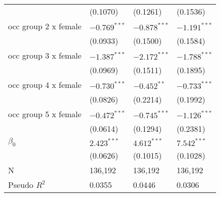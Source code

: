 \begin{tabular}{llll}
                                       &           (0.1070) &           (0.1261) &           (0.1536) \\
occ group 2 x female                   &     $-0.769^{***}$ &     $-0.878^{***}$ &     $-1.191^{***}$ \\
                                       &           (0.0933) &           (0.1500) &           (0.1584) \\
occ group 3 x female                   &     $-1.387^{***}$ &     $-2.172^{***}$ &     $-1.788^{***}$ \\
                                       &           (0.0969) &           (0.1511) &           (0.1895) \\
occ group 4 x female                   &     $-0.730^{***}$ &      $-0.452^{**}$ &     $-0.733^{***}$ \\
                                       &           (0.0826) &           (0.2214) &           (0.1992) \\
occ group 5 x female                   &     $-0.472^{***}$ &     $-0.745^{***}$ &     $-1.126^{***}$ \\
                                       &           (0.0614) &           (0.1294) &           (0.2381) \\
$\beta_0$                              &      $2.423^{***}$ &      $4.612^{***}$ &      $7.542^{***}$ \\
                                       &           (0.0626) &           (0.1015) &           (0.1028) \\
\midrule
N                                      &            136,192 &            136,192 &            136,192 \\
Pseudo $R^2$                           &             0.0355 &             0.0446 &             0.0306 \\
\bottomrule
\end{tabular}
